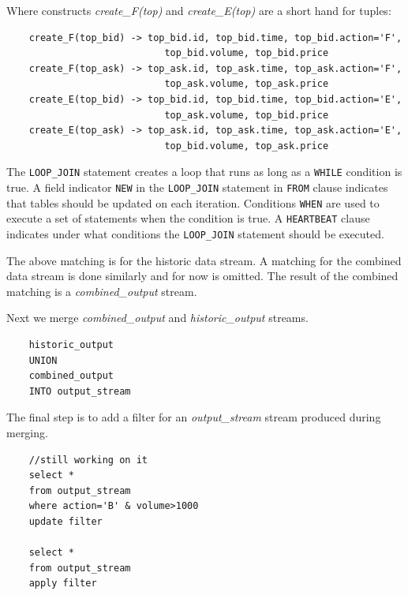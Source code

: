 \documentclass{article}
\begin{document}
\noindent Where constructs \emph{create\_F(top)} and \emph{create\_E(top)} are a short hand for tuples:

\begin{verbatim}
    create_F(top_bid) -> top_bid.id, top_bid.time, top_bid.action='F',
                            top_bid.volume, top_bid.price
    create_F(top_ask) -> top_ask.id, top_ask.time, top_ask.action='F',
                            top_ask.volume, top_ask.price
    create_E(top_bid) -> top_bid.id, top_bid.time, top_bid.action='E',
                            top_ask.volume, top_bid.price
    create_E(top_ask) -> top_ask.id, top_ask.time, top_ask.action='E',
                            top_bid.volume, top_ask.price
\end{verbatim}

The {\tt LOOP\_JOIN} statement creates a loop that runs as long as a {\tt WHILE} condition is true. A field indicator {\tt NEW} in the {\tt LOOP\_JOIN} statement in {\tt FROM} clause indicates that tables should be updated on each iteration. Conditions {\tt WHEN} are used to execute a set of statements when the condition is true. A {\tt HEARTBEAT} clause indicates under what conditions the {\tt LOOP\_JOIN} statement should be executed. 

The above matching is for the historic data stream. A matching for the combined data stream is done similarly and for now is omitted. The result of the combined matching is a \emph{combined\_output} stream. 

Next we merge \emph{combined\_output} and \emph{historic\_output} streams. 

\begin{verbatim}
    historic_output
    UNION
    combined_output
    INTO output_stream
\end{verbatim}

The final step is to add a filter for an \emph{output\_stream} stream produced during merging. 

\begin{verbatim}
    //still working on it
    select *
    from output_stream
    where action='B' & volume>1000
    update filter
    
    select *
    from output_stream
    apply filter
\end{verbatim}
\end{document}

